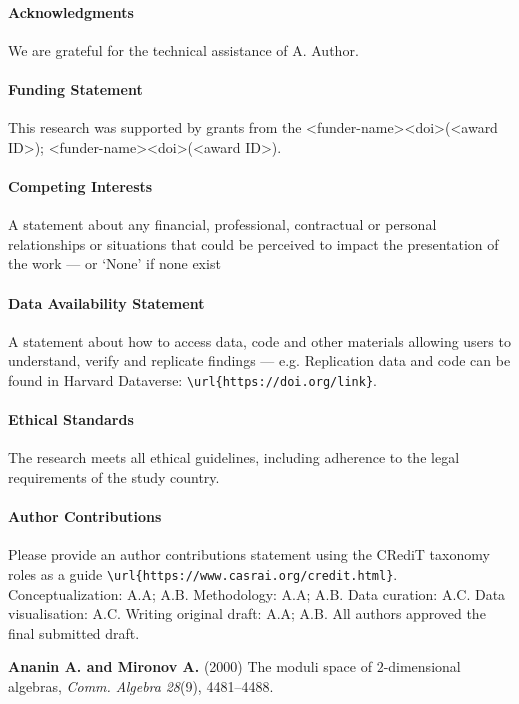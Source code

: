 \documentclass{CUP-JNL-DTM}%
\theoremstyle{definition}
\numberwithin{equation}{section}
\begin{document}
\begin{Backmatter}

\paragraph{Acknowledgments}
We are grateful for the technical assistance of A. Author.


\paragraph{Funding Statement}
This research was supported by grants from the <funder-name><doi>(<award ID>); <funder-name><doi>(<award ID>).

\paragraph{Competing Interests}
A statement about any financial, professional, contractual or personal relationships or situations that could be perceived to impact the presentation of the work --- or `None' if none exist

\paragraph{Data Availability Statement}
A statement about how to access data, code and other materials allowing users to understand, verify and replicate findings --- e.g. Replication data and code can be found in Harvard Dataverse: \verb+\url{https://doi.org/link}+.

\paragraph{Ethical Standards}
The research meets all ethical guidelines, including adherence to the legal requirements of the study country.

\paragraph{Author Contributions}
Please provide an author contributions statement using the CRediT taxonomy roles as a guide {\verb+\url{https://www.casrai.org/credit.html}+}. Conceptualization: A.A; A.B. Methodology: A.A; A.B. Data curation: A.C. Data visualisation: A.C. Writing original draft: A.A; A.B. All authors approved the final submitted draft.

\begin{thebibliography}{}
\textbf{Ananin A. and Mironov A.} (2000) The moduli space of $2$-dimensional algebras, \textit{Comm. Algebra} \textit{28}(9),  {4481}--{4488}.


\end{thebibliography}
\end{Backmatter}
\end{document}
